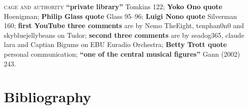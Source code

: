 \textsc{cage and authority}
\textbf{``private library''} Tomkins 122;
\textbf{Yoko Ono quote} Hoenigman;
\textbf{Philip Glass quote} Glass 95--96;
\textbf{Luigi Nono quote} Silverman 160;
\textbf{first YouTube three comments} are by Nemo TheEight, tenphan0n0 and skybluejellybeans on Tudor;
\textbf{second three comments} are by seadog365, claude lara and Captian Bigums on EBU Euradio Orchestra;
\textbf{Betty Trott quote} personal communication;
\textbf{``one of the central musical figures''} Gann (2002) 243.

\newpageforperformers{}

\section{Bibliography}

